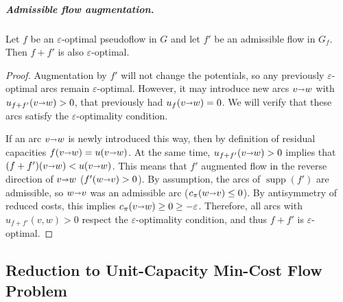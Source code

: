 \documentclass[a4paper,UKenglish]{socg-lipics-v2018}
\makeatletter
\def\note#1{\textcolor{red}{{#1}}}
\def\eps{\varepsilon}
\def\arcto{\mathord\shortrightarrow}
\def\arc#1#2{#1\arcto#2}
\def\supp{\operatorname{supp}}
\theoremstyle{plain}
\numberwithin{figure}{section}
\renewcommand{\paragraph}{\subparagraph}
\def\n@te#1{\textsf{\boldmath \textbf{$\langle\!\langle$#1$\rangle\!\rangle$}}\leavevmode}
\def\note#1{\textcolor{red}{\n@te{#1}}}
\makeatother
\begin{document}
\begin{toappendix}
\paragraph{Admissible flow augmentation.}

\begin{lemmarep}
\label{lemma:eps_opt_preserve}
Let $f$ be an $\eps$-optimal pseudoflow in $G$ and let $f'$ be an
admissible flow in $G_f$.
Then $f + f'$ is also $\eps$-optimal.
\end{lemmarep}

\begin{proof}
Augmentation by $f'$ will not change the potentials, so any previously
$\eps$-optimal arcs remain $\eps$-optimal.
However, it may introduce new arcs $\arc vw$ with $u_{f+f'}(\arc vw) > 0$, that previously had
$u_f(\arc vw) = 0$.
We will verify that these arcs satisfy the $\eps$-optimality condition.

If an arc $\arc vw$ is newly introduced this way, then by definition of residual
capacities $f(\arc vw) = u(\arc vw)$.
At the same time, $u_{f+f'}(\arc vw) > 0$ implies that $(f+f')(\arc vw) < u(\arc vw)$.
This means that $f'$ augmented flow in the reverse direction of $\arc vw$
($f'(\arc wv) > 0$).
By assumption, the arcs of $\supp(f')$ are admissible, so $\arc wv$ was an
admissible arc ($c_\pi(\arc wv) \leq 0$).
By antisymmetry of reduced costs, this implies $c_\pi(\arc vw) \geq 0 \geq -\eps$.
Therefore, all arcs with $u_{f+f'}(v, w) > 0$ respect the $\eps$-optimality condition,
and thus $f+f'$ is $\eps$-optimal.
\end{proof}
\end{toappendix}



\subsection{Reduction to Unit-Capacity Min-Cost Flow Problem}
\label{SS:reduction}
\end{document}
